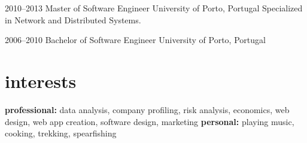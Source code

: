 \documentclass[]{friggeri-cv} %
\begin{document}
\begin{entrylist}


\entry
{2010--2013}
{Master {\normalfont of Software Engineer}}
{University of Porto, Portugal}
{Specialized in Network and Distributed Systems.}


\entry
{2006--2010}
{Bachelor {\normalfont of Software Engineer}}
{University of Porto, Portugal}
{}






\end{entrylist}


\section{interests}

\textbf{professional:} data analysis, company profiling, risk analysis, economics, web design, web app creation, software design, marketing \textbf{personal:} playing music, cooking, trekking, spearfishing
\end{document}
